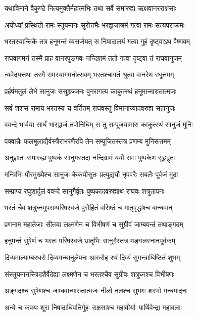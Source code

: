 \twolineshloka
{यथाविमाने वैकुण्ठे नित्यमुक्तैर्महात्मभिः}
{तथा सर्वे समारुह्य ऋक्षवानरराक्षसाः}%

\twolineshloka
{अयोध्यां प्रस्थितो रामः स्तूयमानः सुरोत्तमैः}
{भरद्वाजाश्रमं गत्वा रामः सत्यपराक्रमः}%

\twolineshloka
{भरतस्यान्तिके तत्र हनूमन्तं व्यसर्जयत्}
{स निषादालयं गत्वा गुहं दृष्ट्वाऽथ वैष्णवम्}%

\twolineshloka
{राघवागमनं तस्मै प्राह वानरपुङ्गवः}
{नन्दिग्रामं ततो गत्वा दृष्ट्वा तं राघवानुजम्}%

\twolineshloka
{न्यवेदयत्तथा तस्मै रामस्यागमनोत्सवम्}
{भरतश्चागतं श्रुत्वा वानरेण रघूत्तमम्}%

\twolineshloka
{प्रर्हर्षमतुलं लेभे सानुजः ससुहृज्जनः}
{पुनरागत्य काकुत्स्थं हनूमान्मारुतात्मजः}%

\twolineshloka
{सर्वं शशंस रामाय भरतस्य च वर्तितम्}
{राघवस्तु विमानाग्र्यादवरुह्य सहानुजः}%

\twolineshloka
{ववन्दे भार्यया सार्धं भारद्वाजं तपोनिधिम्}
{स तु सम्पूजयामास काकुत्स्थं सानुजं मुनिः}%

\twolineshloka
{पक्वान्नैः फलमूलाद्यैर्वस्त्रैराभरणैरपि}
{तेन सम्पूजितस्तत्र प्रणम्य मुनिसत्तमम्}%

\twolineshloka
{अनुज्ञातः समारुह्य पुष्पकं सानुगस्तदा}
{नन्दिग्रामं ययौ रामः पुष्पकेण सुहृद्वृतः}%

\twolineshloka
{मन्त्रिभिः पौरमुख्यैश्च सानुजः केकयीसुतः}
{प्रत्युद्ययौ नृपवरैः सबलैः पूर्वजं मुदा}%

\twolineshloka
{सम्प्राप्य रघुशार्दूलं ववन्दे सानुगैर्वृतः}
{पुष्पकादवरुह्याथ राघवः शत्रुतापनः}%

\twolineshloka
{भरतं चैव शत्रुघ्नमुपसम्परिषस्वजे}
{पुरोहितं वसिष्ठं च मातृवृद्धांश्च बान्धवान्}%

\twolineshloka
{प्रणनाम महातेजाः सीतया लक्ष्मणेन च}
{विभीषणं च सुग्रीवं जाम्बवन्तं तथाङ्गदम्}%

\twolineshloka
{हनुमन्तं सुषेणं च भरतः परिषस्वजे}
{भ्रातृभिः सानुगैस्तत्र मङ्गलस्नानपूर्वकम्}%

\twolineshloka
{दिव्यमाल्याम्बरधरो दिव्यगन्धानुलेपनः}
{आरुरोह रथं दिव्यं सुमन्त्राधिष्ठितं शुभम्}%

\twolineshloka
{संस्तूयमानस्त्रिदशैर्वैदेह्या लक्ष्मणेन च}
{भरतश्चैव सुग्रीवः शत्रुघ्नश्च विभीषणः}%

\twolineshloka
{अङ्गदश्च सुषेणश्च जाम्बवान्मारुतात्मजः}
{नीलो नलश्च सुभगः शरभो गन्धमादनः}%

\twolineshloka
{अन्ये च कपयः शूरा निषादाधिपतिर्गुहः}
{राक्षसाश्च महावीर्याः पार्थिवेन्द्रा महाबलाः}%

